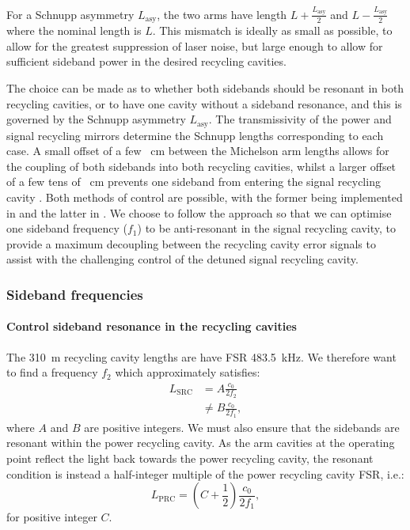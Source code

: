 For a Schnupp asymmetry $L_{\text{asy}}$, the two arms have length $L + \frac{L_{\text{asy}}}{2}$ and $L - \frac{L_{\text{asy}}}{2}$ where the nominal length is $L$. This mismatch is ideally as small as possible, to allow for the greatest suppression of laser noise, but large enough to allow for sufficient sideband power in the desired recycling cavities.

The choice can be made as to whether both sidebands should be resonant in both recycling cavities, or to have one cavity without a sideband resonance, and this is governed by the Schnupp asymmetry $L_{\text{asy}}$. The transmissivity of the power and signal recycling mirrors determine the Schnupp lengths corresponding to each case. A small offset of a few \SI{}{\centi\meter} between the Michelson arm lengths allows for the coupling of both sidebands into both recycling cavities, whilst a larger offset of a few tens of \SI{}{\centi\meter} prevents one sideband from entering the signal recycling cavity \cite{Vajente2008}. Both methods of control are possible, with the former being implemented in \KAGRA{}  and the latter in \ALIGO{} \cite{Abbott2010}. We choose to follow the \ALIGO{} approach so that we can optimise one sideband frequency ($f_1$) to be anti-resonant in the signal recycling cavity, to provide a maximum decoupling between the recycling cavity error signals to assist with the challenging control of the detuned signal recycling cavity.

\subsubsection{Sideband frequencies}

\paragraph{Control sideband resonance in the recycling cavities}
The \SI{310}{\meter} recycling cavity lengths are have \gls{FSR} \SI{483.5}{\kilo\hertz}. We therefore want to find a frequency $f_2$ which approximately satisfies:
\begin{equation}
  \label{eq:src-fsr}
  \begin{split}
    L_{\text{SRC}} &= A \frac{c_0}{2 f_2} \\
                   &\neq B \frac{c_0}{2 f_1},
  \end{split}
\end{equation}
where $A$ and $B$ are positive integers. We must also ensure that the sidebands are resonant within the power recycling cavity. As the arm cavities at the operating point reflect the light back towards the power recycling cavity, the resonant condition is instead a half-integer multiple of the power recycling cavity \gls{FSR}, i.e.:
\begin{equation}
  \label{eq:prc-fsr}
  L_{\text{PRC}} = \left(C + \frac{1}{2} \right) \frac{c_0}{2 f_1},
\end{equation}
for positive integer $C$.

